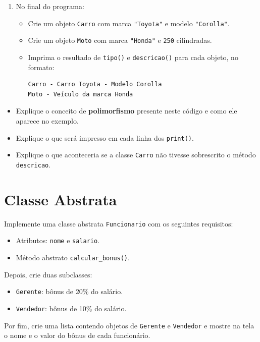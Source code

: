 \begin{enumerate}
    \item No final do programa:
          \begin{itemize}
              \item Crie um objeto \texttt{Carro} com marca \texttt{"Toyota"} e modelo \texttt{"Corolla"}.
              \item Crie um objeto \texttt{Moto} com marca \texttt{"Honda"} e \texttt{250} cilindradas.
              \item Imprima o resultado de \texttt{tipo()} e \texttt{descricao()} para cada objeto, no formato:
                    \begin{verbatim}
Carro - Carro Toyota - Modelo Corolla
Moto - Veículo da marca Honda
        \end{verbatim}
          \end{itemize}
\end{enumerate}
\begin{itemize}
    \item[(a)] Explique o conceito de \textbf{polimorfismo} presente neste código e como ele aparece no exemplo.
    \item[(b)] Explique o que será impresso em cada linha dos \texttt{print()}.
    \item[(c)] Explique o que aconteceria se a classe \texttt{Carro} não tivesse sobrescrito o método \texttt{descricao}.
\end{itemize}

\section{Classe Abstrata}
Implemente uma classe abstrata \texttt{Funcionario} com os seguintes requisitos:
\begin{itemize}
    \item Atributos: \texttt{nome} e \texttt{salario}.
    \item Método abstrato \texttt{calcular\_bonus()}.
\end{itemize}

Depois, crie duas subclasses:
\begin{itemize}
    \item \texttt{Gerente}: bônus de 20\% do salário.
    \item \texttt{Vendedor}: bônus de 10\% do salário.
\end{itemize}

Por fim, crie uma lista contendo objetos de \texttt{Gerente} e \texttt{Vendedor} e mostre na tela o nome e o valor do bônus de cada funcionário.


